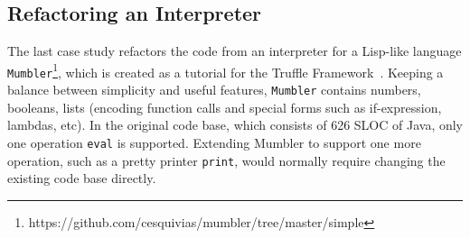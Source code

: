 \subsection{Refactoring an Interpreter}\label{subsec:int}
\begin{comment}
The last case study refactors the code from an interpreter for
a Lisp-like language
\lstinline{Mumbler}\footnote{https://github.com/cesquivias/mumbler/tree/master/simple},
which is created as a tutorial for the Truffle
Framework~\cite{wurthinger2013one}.  Keeping a balance between
simplicity and useful features, \lstinline{Mumbler} contains numbers,
booleans, lists (encoding function calls and special forms such as
if-expression, lambdas, etc). In the original code base, which
consists of 626 SLOC of Java, only one operation \texttt{eval} is
supported. Extending Mumbler to support one more operation, such as a
pretty printer (making it 661 SLOC), would normally require changing the existing code base
directly.

Our refactoring applies the pattern presented in
Section~\ref{subsec:ep} to the existing Mumbler code base to improve
its modularity and extensibility. Using the refactored code base (560 SLOC) it  
becomes possible to add new operations modularly, and to support
independent extensibility (677 SLOC). We add one more
operation \texttt{print} to both the original and the refactored code
base. In the original code base the pretty printer is added
non-modularly by modifying the existing code. In the refactored code
base the pretty printer is added modularly. 
Although the code in the refactored version is slightly increased (by 2.4\% SLOC), the
modularity is greatly increased, allowing for improved reusability and maintainability.
\end{comment}

The last case study refactors the code from an interpreter for
a Lisp-like language
\lstinline{Mumbler}\footnote{https://github.com/cesquivias/mumbler/tree/master/simple},
which is created as a tutorial for the Truffle
Framework~\cite{wurthinger2013one}.  Keeping a balance between
simplicity and useful features, \lstinline{Mumbler} contains numbers,
booleans, lists (encoding function calls and special forms such as
if-expression, lambdas, etc). In the original code base, which
consists of 626 SLOC of Java, only one operation \texttt{eval} is
supported. Extending Mumbler to support one more operation, such as a
pretty printer \texttt{print}, would normally require changing the existing code base
directly.


